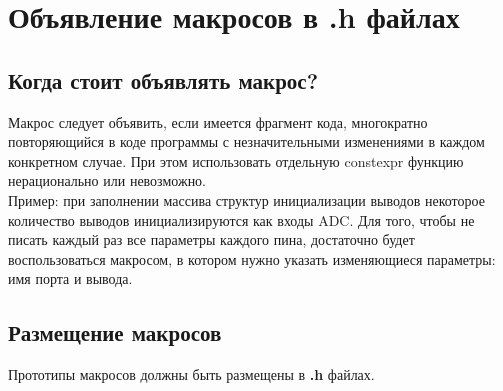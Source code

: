 \chapter{Объявление макросов в .h файлах}\label{mackros:0}
\section{Когда стоит объявлять макрос?}
Макрос следует объявить, если имеется фрагмент кода, многократно повторяющийся в коде программы с незначительными изменениями в каждом конкретном случае. При этом использовать отдельную constexpr функцию нерационально или невозможно.\\Пример: при заполнении массива структур инициализации выводов некоторое количество выводов инициализируются как входы ADC. Для того, чтобы не писать каждый раз все параметры каждого пина, достаточно будет воспользоваться макросом, в котором нужно указать изменяющиеся параметры: имя порта и вывода.

\section{Размещение макросов}
Прототипы макросов должны быть размещены в \textbf{.h} файлах.

